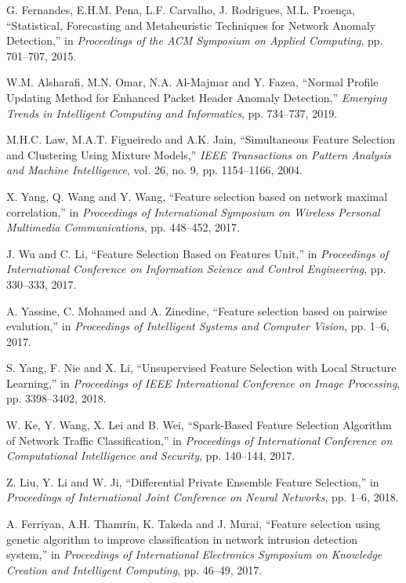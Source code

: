 \documentclass{ieeeaccess}
\theoremstyle{definition}
\begin{document}
\begin{thebibliography}{00}
    G. Fernandes, E.H.M. Pena, L.F. Carvalho, J. Rodrigues, M.L. Proença, ``Statistical, Forecasting and Metaheuristic Techniques for Network Anomaly Detection,'' in \emph{Proceedings of the ACM Symposium on Applied Computing}, pp. 701--707, 2015. 

    W.M. Alsharafi, M.N. Omar, N.A. Al-Majmar and Y. Fazea, ``Normal Profile Updating Method for Enhanced Packet Header Anomaly Detection,'' \emph{Emerging Trends in Intelligent Computing and Informatics}, pp. 734--737, 2019.

    M.H.C. Law, M.A.T. Figueiredo and A.K. Jain, ``Simultaneous Feature Selection and Clustering Using Mixture Models,'' \emph{IEEE Transactions on Pattern Analysis and Machine Intelligence}, vol. 26, no. 9, pp. 1154--1166, 2004.

    X. Yang, Q. Wang and Y. Wang, ``Feature selection based on network maximal correlation,'' in \emph{Proceedings of International Symposium on Wireless Personal Multimedia Communications}, pp. 448--452, 2017.

    J. Wu and C. Li, ``Feature Selection Based on Features Unit,'' in \emph{Proceedings of International Conference on Information Science and Control Engineering}, pp. 330--333, 2017.

    A. Yassine, C. Mohamed and A. Zinedine, ``Feature selection based on pairwise evalution,'' in \emph{Proceedings of Intelligent Systems and Computer Vision}, pp. 1--6, 2017.

    S. Yang, F. Nie and X. Li, ``Unsupervised Feature Selection with Local Structure Learning,'' in \emph{Proceedings of IEEE International Conference on Image Processing}, pp. 3398--3402, 2018.

    W. Ke, Y. Wang, X. Lei and B. Wei, ``Spark-Based Feature Selection Algorithm of Network Traffic Classification,'' in \emph{Proceedings of International Conference on Computational Intelligence and Security}, pp. 140--144, 2017.
    
    Z. Liu, Y. Li and W. Ji, ``Differential Private Ensemble Feature Selection,'' in \emph{Proceedings of International Joint Conference on Neural Networks}, pp. 1--6, 2018.

    A. Ferriyan, A.H. Thamrin, K. Takeda and J. Murai, ``Feature selection using genetic algorithm to improve classification in network intrusion detection system,'' in \emph{Proceedings of International Electronics Symposium on Knowledge Creation and Intelligent Computing}, pp. 46--49, 2017.


\end{thebibliography}
\end{document}

